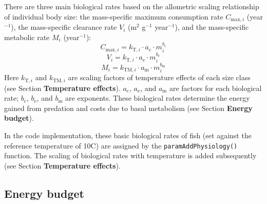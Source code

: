 \documentclass[
]{article}
\begin{document}
There are three main biological rates based on the allometric scaling
relationship of individual body size: the mass-specific maximum
consumption rate \(C_{\mathrm{max},i}\) (year\(^{-1}\)), the
mass-specific clearance rate \(V_{i}\) (m\(^{2}\) g\(^{-1}\)
year\(^{-1}\)), and the mass-specific metabolic rate \(M_i\)
(year\(^{-1}\)): \begin{equation}
C_{\mathrm{max},i} = k_{\mathrm{T},i} \cdot a_{\mathrm{c}} \cdot m_{i}^{b_{\mathrm{c}}}  \label{eq:maxconsump}
\end{equation} \begin{equation}
V_{i} = k_{\mathrm{T},i} \cdot a_{\mathrm{e}} \cdot m_{i}^{b_{\mathrm{e}}}      \label{eq:clearance}
\end{equation} \begin{equation}
M_i = k_{\mathrm{TM},i} \cdot a_{\mathrm{m}} \cdot m_{i}^{b_{\mathrm{m}}}       \label{eq:metabolism}
\end{equation} Here \(k_{\mathrm{T},i}\) and \(k_{\mathrm{TM},i}\) are
scaling factors of temperature effects of each size class (see Section
\textbf{Temperature effects}). \(a_{\mathrm{c}}\), \(a_{\mathrm{e}}\),
and \(a_{\mathrm{m}}\) are factors for each biological rate;
\(b_{\mathrm{c}}\), \(b_{\mathrm{e}}\), and \(b_{\mathrm{m}}\) are
exponents. These biological rates determine the energy gained from
predation and costs due to basal metabolism (see Section \textbf{Energy
budget}).

In the code implementation, these basic biological rates of fish (set
against the reference temperature of 10\textdegree{}C) are assigned by
the \texttt{paramAddPhysiology()} function. The scaling of biological
rates with temperature is added subsequently (see Section
\textbf{Temperature effects}).

\hypertarget{energy-budget}{%
\subsection{Energy budget}\label{energy-budget}}
\end{document}
